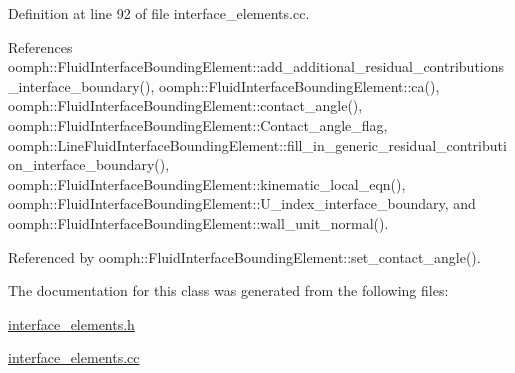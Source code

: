 Definition at line 92 of file interface\+\_\+elements.\+cc.



References oomph\+::\+Fluid\+Interface\+Bounding\+Element\+::add\+\_\+additional\+\_\+residual\+\_\+contributions\+\_\+interface\+\_\+boundary(), oomph\+::\+Fluid\+Interface\+Bounding\+Element\+::ca(), oomph\+::\+Fluid\+Interface\+Bounding\+Element\+::contact\+\_\+angle(), oomph\+::\+Fluid\+Interface\+Bounding\+Element\+::\+Contact\+\_\+angle\+\_\+flag, oomph\+::\+Line\+Fluid\+Interface\+Bounding\+Element\+::fill\+\_\+in\+\_\+generic\+\_\+residual\+\_\+contribution\+\_\+interface\+\_\+boundary(), oomph\+::\+Fluid\+Interface\+Bounding\+Element\+::kinematic\+\_\+local\+\_\+eqn(), oomph\+::\+Fluid\+Interface\+Bounding\+Element\+::\+U\+\_\+index\+\_\+interface\+\_\+boundary, and oomph\+::\+Fluid\+Interface\+Bounding\+Element\+::wall\+\_\+unit\+\_\+normal().



Referenced by oomph\+::\+Fluid\+Interface\+Bounding\+Element\+::set\+\_\+contact\+\_\+angle().



The documentation for this class was generated from the following files\+:\begin{DoxyCompactItemize}
\item 
\hyperlink{interface__elements_8h}{interface\+\_\+elements.\+h}\item 
\hyperlink{interface__elements_8cc}{interface\+\_\+elements.\+cc}\end{DoxyCompactItemize}
